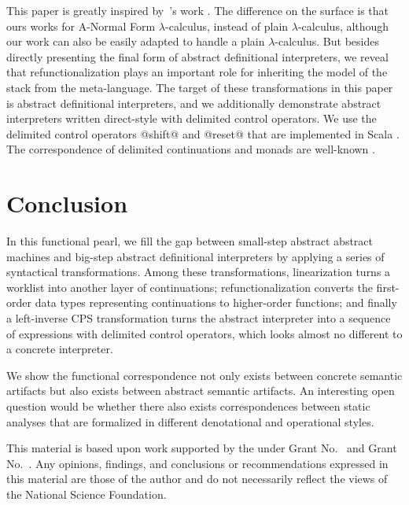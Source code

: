 \documentclass[acmsmall, review]{acmart}\settopmatter{}
\begin{document}
This paper is greatly inspired by~\citeauthor{darais2017abstracting}'s work \cite{darais2017abstracting}.
The difference on the surface is that ours works for A-Normal Form $\lambda$-calculus, instead of plain 
$\lambda$-calculus, although our work can also be easily adapted to handle a plain $\lambda$-calculus. 
But besides directly presenting the final form of abstract definitional interpreters, we reveal that 
refunctionalization plays an important role for inheriting the model of the stack from the meta-language. 
The target of these transformations in this paper is abstract definitional interpreters, and we 
additionally demonstrate abstract interpreters written direct-style with delimited control operators. 
We use the delimited control operators @shift@ and @reset@ that are implemented in Scala 
\cite{rompf2009implementing}. The correspondence of delimited continuations and monads are well-known
\cite{Danvy:1990:AC:91556.91622, wadler1992essence, danvy1992representing, moggi1991notions}.

\section{Conclusion}\label{sec:conclusion}


In this functional pearl, we fill the gap between small-step abstract abstract machines
and big-step abstract definitional interpreters by applying a series of syntactical
transformations. Among these transformations, linearization turns a worklist into another
layer of continuations; refunctionalization converts the first-order data types representing
continuations to higher-order functions; and finally a left-inverse CPS transformation turns
the abstract interpreter into a sequence of expressions with delimited control operators,
which looks almost no different to a concrete interpreter.

We show the functional correspondence not only exists between concrete semantic artifacts
but also exists between abstract semantic artifacts. An interesting open question would
be whether there also exists correspondences between static analyses that are formalized 
in different denotational and operational styles.

\begin{acks}                            %
  This material is based upon work supported by the
   under Grant
  No.~ and Grant
  No.~.  Any opinions, findings, and
  conclusions or recommendations expressed in this material are those
  of the author and do not necessarily reflect the views of the
  National Science Foundation.
\end{acks}
\end{document}
